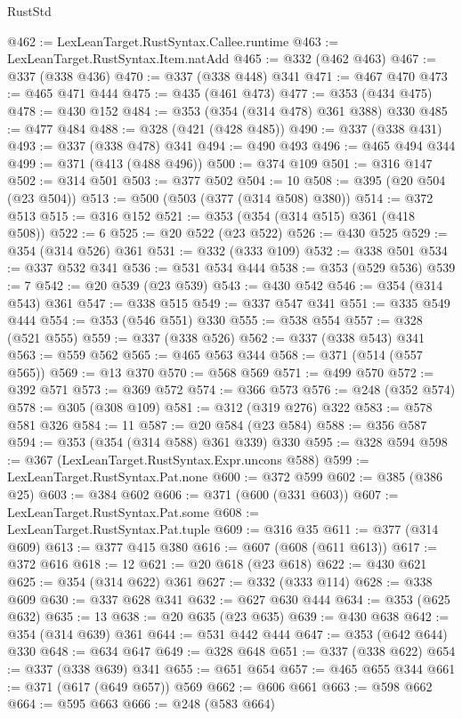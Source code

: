 \begin{lexlean}{RustStd}
\begin{coremodule}
{\begin{coremodule}
{{{{{{{{@462 := LexLeanTarget.RustSyntax.Callee.runtime
@463 := LexLeanTarget.RustSyntax.Item.natAdd
@465 := @332 (@462 @463)
@467 := @337 (@338 @436)
@470 := @337 (@338 @448) @341
@471 := @467 @470
@473 := @465 @471 @444
@475 := @435 (@461 @473)
@477 := @353 (@434 @475)
@478 := @430 @152
@484 := @353 (@354 (@314 @478) @361 @388) @330
@485 := @477 @484
@488 := @328 (@421 (@428 @485))
@490 := @337 (@338 @431)
@493 := @337 (@338 @478) @341
@494 := @490 @493
@496 := @465 @494 @344
@499 := @371 (@413 (@488 @496))
@500 := @374 @109
@501 := @316 @147
@502 := @314 @501
@503 := @377 @502
@504 := 10
@508 := @395 (@20 @504 (@23 @504))
@513 := @500 (@503 (@377 (@314 @508) @380))
@514 := @372 @513
@515 := @316 @152
@521 := @353 (@354 (@314 @515) @361 (@418 @508))
@522 := 6
@525 := @20 @522 (@23 @522)
@526 := @430 @525
@529 := @354 (@314 @526) @361
@531 := @332 (@333 @109)
@532 := @338 @501
@534 := @337 @532 @341
@536 := @531 @534 @444
@538 := @353 (@529 @536)
@539 := 7
@542 := @20 @539 (@23 @539)
@543 := @430 @542
@546 := @354 (@314 @543) @361
@547 := @338 @515
@549 := @337 @547 @341
@551 := @335 @549 @444
@554 := @353 (@546 @551) @330
@555 := @538 @554
@557 := @328 (@521 @555)
@559 := @337 (@338 @526)
@562 := @337 (@338 @543) @341
@563 := @559 @562
@565 := @465 @563 @344
@568 := @371 (@514 (@557 @565))
@569 := @13 @370
@570 := @568 @569
@571 := @499 @570
@572 := @392 @571
@573 := @369 @572
@574 := @366 @573
@576 := @248 (@352 @574)
@578 := @305 (@308 @109)
@581 := @312 (@319 @276) @322
@583 := @578 @581 @326
@584 := 11
@587 := @20 @584 (@23 @584)
@588 := @356 @587
@594 := @353 (@354 (@314 @588) @361 @339) @330
@595 := @328 @594
@598 := @367 (LexLeanTarget.RustSyntax.Expr.uncons @588)
@599 := LexLeanTarget.RustSyntax.Pat.none
@600 := @372 @599
@602 := @385 (@386 @25)
@603 := @384 @602
@606 := @371 (@600 (@331 @603))
@607 := LexLeanTarget.RustSyntax.Pat.some
@608 := LexLeanTarget.RustSyntax.Pat.tuple
@609 := @316 @35
@611 := @377 (@314 @609)
@613 := @377 @415 @380
@616 := @607 (@608 (@611 @613))
@617 := @372 @616
@618 := 12
@621 := @20 @618 (@23 @618)
@622 := @430 @621
@625 := @354 (@314 @622) @361
@627 := @332 (@333 @114)
@628 := @338 @609
@630 := @337 @628 @341
@632 := @627 @630 @444
@634 := @353 (@625 @632)
@635 := 13
@638 := @20 @635 (@23 @635)
@639 := @430 @638
@642 := @354 (@314 @639) @361
@644 := @531 @442 @444
@647 := @353 (@642 @644) @330
@648 := @634 @647
@649 := @328 @648
@651 := @337 (@338 @622)
@654 := @337 (@338 @639) @341
@655 := @651 @654
@657 := @465 @655 @344
@661 := @371 (@617 (@649 @657)) @569
@662 := @606 @661
@663 := @598 @662
@664 := @595 @663
@666 := @248 (@583 @664)
}}}}}}}}
\end{coremodule}}
\end{coremodule}
\end{lexlean}
